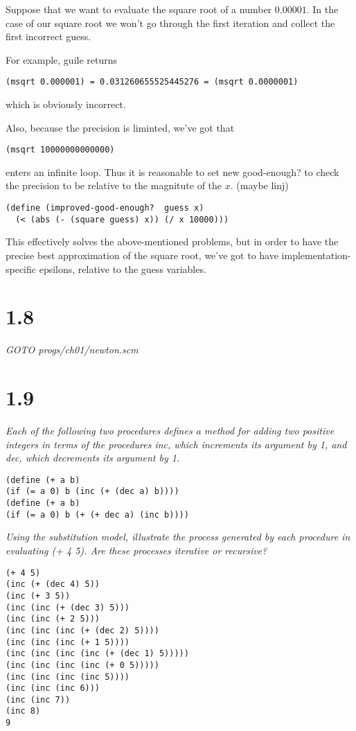 \documentclass[11pt,oneside,titlepage]{book}
\begin{document}
Suppose that we want to evaluate the square root of a number $0.00001$. In the case of
our square root we won't go through the first iteration and collect the first incorrect guess.

For example, guile returns
\begin{verbatim}
(msqrt 0.000001) = 0.031260655525445276 = (msqrt 0.0000001)
\end{verbatim}
which is obviously incorrect.

Also, because the precision is liminted, we've got that
\begin{verbatim}
(msqrt 10000000000000)
\end{verbatim}
enters an infinite loop. Thus it is reasonable to set new good-enough? to check
the precision to be relative to the magnitute of the $x$. (maybe linj)
\begin{verbatim}
(define (improved-good-enough?  guess x)
  (< (abs (- (square guess) x)) (/ x 10000)))
\end{verbatim}
This effectively solves the above-mentioned
problems, but in order to have the precise best approximation
of the square root, we've got to have implementation-specific epsilons, relative to the 
guess variables.

\section*{1.8}

\textit{GOTO progs/ch01/newton.scm}


\section*{1.9}
\textit{Each of the following two procedures defines a method for adding two positive
  integers in terms of the procedures inc, which increments its argument by 1, and
  dec, which decrements its argument by 1.}

\begin{verbatim}
(define (+ a b)
(if (= a 0) b (inc (+ (dec a) b))))
(define (+ a b)
(if (= a 0) b (+ (+ dec a) (inc b))))
\end{verbatim}

\textit{Using the substitution model, illustrate the process generated by each
  procedure in evaluating (+ 4 5). Are these processes iterative or recursive?}

\begin{verbatim}
(+ 4 5)
(inc (+ (dec 4) 5))
(inc (+ 3 5))
(inc (inc (+ (dec 3) 5)))
(inc (inc (+ 2 5)))
(inc (inc (inc (+ (dec 2) 5))))
(inc (inc (inc (+ 1 5))))
(inc (inc (inc (inc (+ (dec 1) 5)))))
(inc (inc (inc (inc (+ 0 5)))))
(inc (inc (inc (inc 5))))
(inc (inc (inc 6)))
(inc (inc 7))
(inc 8)
9
\end{verbatim}
\end{document}
